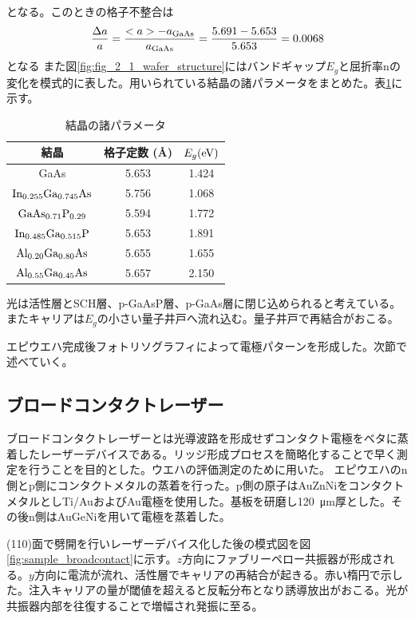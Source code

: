 となる。このときの格子不整合は
\begin{eqnarray}
\dfrac{\Delta a}{a}=\dfrac{<a> - a_{\rm{GaAs}}}{a_{\rm{GaAs}}}=\dfrac{5.691-5.653}{5.653}=0.0068
\end{eqnarray}
となる
また図\ref{fig:fig_2_1_wafer_structure}にはバンドギャップ$E_{g}$と屈折率nの変化を模式的に表した。用いられている結晶の諸パラメータをまとめた。表\ref{table:table_2_1_parameter}に示す。
\begin{table}[h]
  \caption{結晶の諸パラメータ}
    \label{table:table_2_1_parameter}
  \centering
  \begin{tabular}{ccc}
    \hline
      結晶&格子定数 (\AA) & $E_{g} (\rm{eV})$  \\
    \hline \hline
    GaAs  & 5.653&  1.424  \\
    $\rm{In_{0.255}Ga_{0.745}As}$&  5.756& 1.068  \\
    $\rm{GaAs_{0.71}P_{0.29}}$  &  5.594&1.772 \\
    $\rm{In_{0.485}Ga_{0.515}P}$& 5.653& 1.891\\
    $\rm{Al_{0.20}Ga_{0.80}As}$&5.655& 1.655\\
    $\rm{Al_{0.55}Ga_{0.45}As}$&5.657& 2.150\\
       \hline
  \end{tabular}
\end{table}

光は活性層とSCH層、p-GaAsP層、p-GaAs層に閉じ込められると考えている。またキャリアは$E_{g}$の小さい量子井戸へ流れ込む。量子井戸で再結合がおこる。

エピウエハ完成後フォトリソグラフィによって電極パターンを形成した。次節で述べていく。

\subsection{ブロードコンタクトレーザー}%
ブロードコンタクトレーザーとは光導波路を形成せずコンタクト電極をベタに蒸着したレーザーデバイスである。リッジ形成プロセスを簡略化することで早く測定を行うことを目的とした。ウエハの評価測定のために用いた。
エピウエハのn側とp側にコンタクトメタルの蒸着を行った。p側の原子はAuZnNiをコンタクトメタルとしTi/AuおよびAu電極を使用した。基板を研磨し120\ \si{\micro\metre}厚とした。その後n側はAuGeNiを用いて電極を蒸着した。


(110)面で劈開を行いレーザーデバイス化した後の模式図を図\ref{fig:sample_broadcontact}に示す。$z$方向にファブリーペロー共振器が形成される。$y$方向に電流が流れ、活性層でキャリアの再結合が起きる。赤い楕円で示した。注入キャリアの量が閾値を超えると反転分布となり誘導放出がおこる。光が共振器内部を往復することで増幅され発振に至る。

